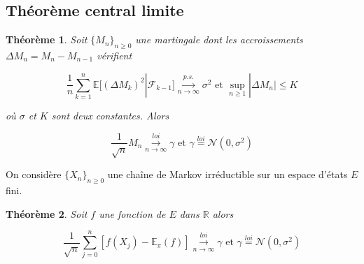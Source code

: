 \documentclass[10pt,a4paper,oneside]{article}
\newtheorem{theoreme}{Théorème}
\begin{document}
\subsection{Théorème central limite}

\begin{theoreme}
Soit $\{ M_n \}_{n \geq 0}$ une martingale dont les accroissements $\Delta M_n = M_n - M_{n - 1}$ vérifient

\[ \frac{1}{n} \sum_{k = 1}^n \mathbb{E}[(\Delta M_k)^2 | \mathcal{F}_{k - 1}] \overset{p.s.}{\underset{n \to \infty}{\longrightarrow}} \sigma^2 \text{ et } \sup_{n \geq 1} | \Delta M_n | \leq K \]

où $\sigma$ et $K$ sont deux constantes. Alors

\[ \frac{1}{\sqrt{n}} M_n \overset{loi}{\underset{n \to \infty}{\longrightarrow}} \gamma \text{ et } \gamma \overset{loi}{=} \mathcal{N}(0,\sigma^2) \]
\end{theoreme}

On considère $\{ X_n \}_{n \geq 0}$ une chaîne de Markov irréductible sur un espace d'états $E$ fini.

\begin{theoreme}
Soit $f$ une fonction de $E$ dans $\mathbb{R}$ alors

\[ \frac{1}{\sqrt{n}} \sum_{j = 0}^n [f(X_j) - \mathbb{E}_\pi(f)] \overset{loi}{\underset{n \to \infty}{\longrightarrow}} \gamma \text{ et } \gamma \overset{loi}{=} \mathcal{N}(0,\sigma^2) \]
\end{theoreme}
\end{document}
